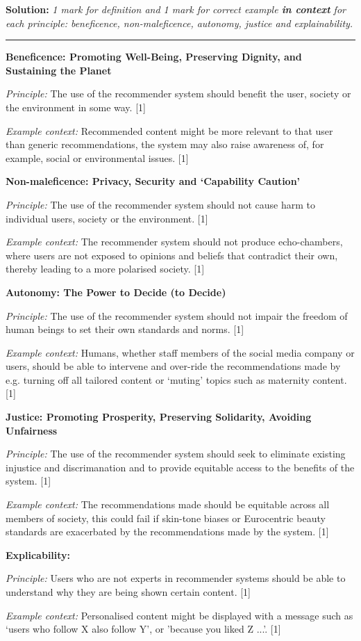 \documentclass[a4paper, 11pt]{article}
\begin{document}
{\color{blue}
\textbf{Solution:} \textit{1 mark for definition and 1 mark for correct example \textbf{in context} for each principle: beneficence, non-maleficence, autonomy, justice and explainability.}

\vspace{2em}

\hrule 

\vspace{2em}

\textbf{Beneficence:  Promoting Well-Being, Preserving Dignity, and Sustaining the Planet} 

\textit{Principle:} The use of the recommender system should benefit the user, society or the environment in some way. [1]

\textit{Example context:} Recommended content might be more relevant to that user than generic recommendations, the system may also raise awareness of, for example,  social or environmental issues.  [1]


\textbf{Non-maleficence: Privacy, Security and ‘Capability Caution’}

\textit{Principle:} The use of the recommender system should not cause harm to individual users, society or the environment. [1]

\textit{Example context:} The recommender system should not produce echo-chambers, where users are not exposed to opinions and beliefs that contradict their own, thereby leading to a more polarised society. [1]


\textbf{Autonomy: The Power to Decide (to Decide)} 

\textit{Principle:} The use of the recommender system should not impair the freedom of human beings to set their own standards and norms. [1]

\textit{Example context:} Humans, whether staff members of the social media company or users, should be able to intervene and over-ride the recommendations made by e.g. turning off all tailored content or `muting' topics such as maternity content. [1]


\textbf{Justice: Promoting Prosperity, Preserving Solidarity, Avoiding Unfairness} 

\textit{Principle:} The use of the recommender system should seek to eliminate existing injustice and discrimanation and to provide equitable access to the benefits of the system. [1]

\textit{Example context:} The recommendations made should be equitable across all members of society, this could fail if skin-tone biases or Eurocentric beauty standards are exacerbated by the recommendations made by the system. [1]


\textbf{Explicability:}

\textit{Principle:} Users who are not experts in recommender systems should be able to understand why they are being shown certain content. [1]

\textit{Example context:} Personalised content might be displayed with a message such as `users who follow X also follow Y', or 'because you liked Z ...'. [1]
}
\end{document}
